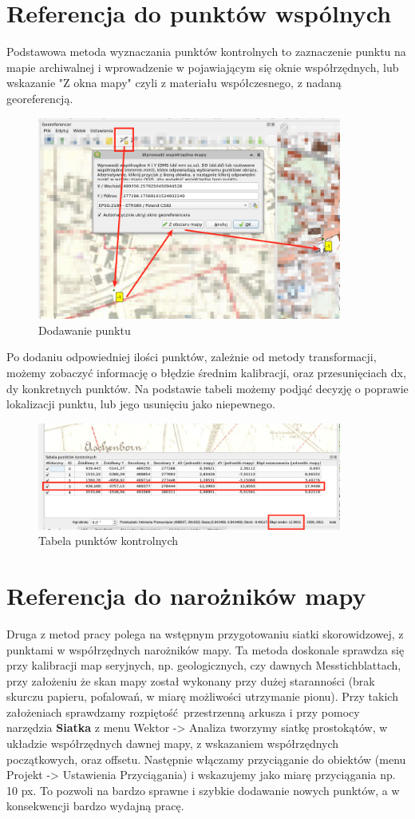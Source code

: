 \documentclass[a4paper,11pt, onecolumn, openany]{memoir}
\begin{document}
		\section{Referencja do punktów wspólnych}
		Podstawowa metoda wyznaczania punktów kontrolnych to zaznaczenie punktu na mapie archiwalnej i wprowadzenie w pojawiającym się oknie współrzędnych, lub wskazanie "Z okna mapy" czyli z materiału współczesnego, z nadaną georeferencją.
		\begin{figure}[!ht]
			\centering
			\includegraphics[width=10cm]{georef-dodaj}
			\caption{Dodawanie punktu}
		\end{figure}
		Po dodaniu odpowiedniej ilości punktów, zależnie od metody transformacji, możemy zobaczyć informację o błędzie średnim kalibracji, oraz przesunięciach dx, dy konkretnych punktów. Na podstawie tabeli możemy podjąć decyzję o poprawie lokalizacji punktu, lub jego usunięciu jako niepewnego.
		\begin{figure}[!ht]
		\centering
		\includegraphics[width=10cm]{georef-tabela-punktow}
		\caption{Tabela punktów kontrolnych}
	\end{figure}
		\section{Referencja do narożników mapy}
		Druga z metod pracy polega na wstępnym przygotowaniu siatki skorowidzowej, z punktami w współrzędnych narożników mapy. Ta metoda doskonale sprawdza się przy kalibracji map seryjnych, np. geologicznych, czy dawnych Messtichblattach, przy założeniu że skan mapy został wykonany przy dużej staranności (brak skurczu papieru, pofalowań, w miarę możliwości utrzymanie pionu).
		Przy takich założeniach sprawdzamy rozpiętość przestrzenną arkusza i przy pomocy narzędzia \textbf{Siatka} z menu Wektor -> Analiza tworzymy siatkę prostokątów, w układzie współrzędnych dawnej mapy, z wskazaniem współrzędnych początkowych, oraz offsetu.
		Następnie włączamy przyciąganie do obiektów (menu Projekt -> Ustawienia Przyciągania) i wskazujemy jako miarę przyciągania np. 10 px. To pozwoli na bardzo sprawne i szybkie dodawanie nowych punktów, a w konsekwencji bardzo wydajną pracę.
\end{document}
